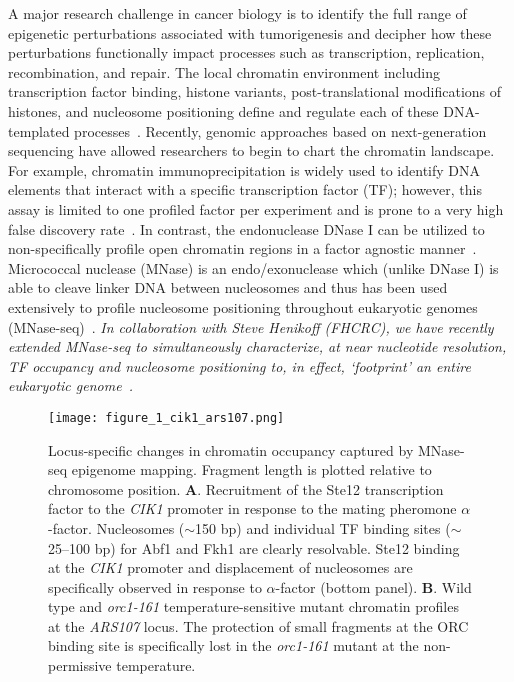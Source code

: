 \documentclass[11pt]{article}
\newcounter{sheading}[section]
\newcounter{ssheading}[sheading]
\def\ssheading#1{\noindent\refstepcounter{ssheading}{\sffamily \color{dukeblue} \bfseries \textsl {#1}\hspace{.7em}}}
\newcommand\orcmt{\emph{orc1\dash 161}\xspace}
\newcommand\dash{\nobreakdash-\hspace{0pt}}
\begin{document}
\ssheading{Technological Innovation}
A major research challenge in cancer biology is to identify the full range of epigenetic perturbations associated with tumorigenesis and decipher how these perturbations functionally impact processes such as transcription, replication, recombination, and repair.  The local chromatin environment including transcription factor binding, histone variants, post-translational modifications of histones, and nucleosome positioning define and regulate each of these DNA-templated processes~\citep{Bernstein2012}.  Recently, genomic approaches based on next-generation sequencing have allowed researchers to begin to chart the chromatin landscape.  For example, chromatin immunoprecipitation is widely used to identify DNA elements that interact with a specific transcription factor (TF); however, this assay is limited to one profiled factor per experiment and is prone to a very high false discovery rate~\citep{Teytelman2013}. In contrast, the endonuclease DNase I can be utilized to non-specifically profile open chromatin regions in a factor agnostic manner~\citep{Boyle2008}. Micrococcal nuclease (MNase) is an endo/exonuclease which (unlike DNase I) is able to cleave linker DNA between nucleosomes and thus has been used extensively to profile nucleosome positioning throughout eukaryotic genomes (MNase-seq)~\citep{Yuan2005,Eaton2010,Gaffney2012}. \emph{\color{dukeblue}In collaboration with Steve Henikoff (FHCRC), we have recently extended MNase-seq to simultaneously characterize, at near nucleotide resolution, TF occupancy and nucleosome positioning to, in effect, `footprint' an entire eukaryotic genome~\citep{Henikoff2011}.}

\begin{figure}[t!]
\begin{center}
\texttt{[image: figure\_1\_cik1\_ars107.png]}
\end{center}
\vspace{3mm}
\caption{Locus-specific changes in chromatin occupancy captured by MNase-seq epigenome mapping. Fragment length is plotted relative to chromosome position.  {\bfseries \sffamily A}.  Recruitment of the Ste12 transcription factor to the \emph{CIK1} promoter in response to the mating pheromone $\alpha$\dash factor.  Nucleosomes ($\sim$150 bp) and individual TF binding sites ($\sim$25--100 bp) for Abf1 and Fkh1 are clearly resolvable.  Ste12 binding at the \emph{CIK1} promoter and displacement of nucleosomes are specifically observed in response to $\alpha$-factor (bottom panel).  {\bfseries \sffamily B}.  Wild type and \orcmt temperature-sensitive mutant chromatin profiles at the \emph{ARS107} locus.  The protection of small fragments at the ORC binding site is specifically lost in the \orcmt mutant at the non-permissive temperature.}
\end{figure}
\end{document}
